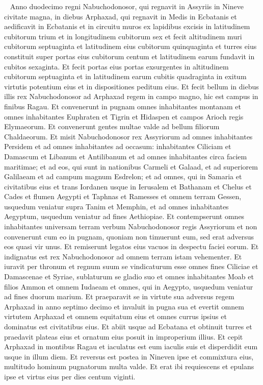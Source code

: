 
\begin{biblechapter}   
\verse Anno duodecimo regni Nabuchodonosor, qui regnavit in Assyriis in Nineve civitate magna, in diebus Arphaxad, qui regnavit in Medis in Ecbatanis 
\verse et aedificavit in Ecbatanis et in circuitu muros ex lapidibus excisis in latitudinem cubitorum trium et in longitudinem cubitorum sex et fecit altitudinem muri cubitorum septuaginta et latitudinem eius cubitorum quinquaginta 
\verse et turres eius constituit super portas eius cubitorum centum et latitudinem earum fundavit in cubitos sexaginta. 
\verse Et fecit portas eius portas exsurgentes in altitudinem cubitorum septuaginta et in latitudinem earum cubitis quadraginta in exitum virtutis potentium eius et in dispositiones peditum eius. 
\verse Et fecit bellum in diebus illis rex Nabuchodonosor ad Arphaxad regem in campo magno, hic est campus in finibus Ragau. 
\verse Et convenerunt in pugnam omnes inhabitantes montanam et omnes inhabitantes Euphraten et Tigrin et Hidaspen et campos Arioch regis Elymaeorum. Et convenerunt gentes multae valde ad bellum filiorum Chaldaeorum. 
\verse Et misit Nabuchodonosor rex Assyriorum ad omnes inhabitantes Persidem et ad omnes inhabitantes ad occasum: inhabitantes Ciliciam et Damascum et Libanum et Antilibanum et ad omnes inhabitantes circa faciem maritimae; 
\verse et ad eos, qui sunt in nationibus Carmeli et Galaad, et ad superiorem Galilaeam et ad campum magnum Esdrelon; 
\verse et ad omnes, qui in Samaria et civitatibus eius et trans Iordanen usque in Ierusalem et Bathanam et Chelus et Cades et flumen Aegypti et Taphnas et Ramesses et omnem terram Gessen,  
\verse usquedum veniatur supra Tanim et Memphin, et ad omnes inhabitantes Aegyptum, usquedum veniatur ad fines Aethiopiae. 
\verse Et contempserunt omnes inhabitantes universam terram verbum Nabuchodonosor regis Assyriorum et non convenerunt cum eo in pugnam, quoniam non timuerunt eum, sed erat adversus eos quasi vir unus. Et remiserunt legatos eius vacuos in despectu faciei eorum.  
\verse Et indignatus est rex Nabuchodonosor ad omnem terram istam vehementer. Et iuravit per thronum et regnum suum se vindicaturum esse omnes fines Ciliciae et Damascenae et Syriae, sublaturum se gladio suo et omnes inhabitantes Moab et filios Ammon et omnem Iudaeam et omnes, qui in Aegypto, usquedum veniatur ad fines duorum marium. 
\verse Et praeparavit se in virtute sua adversus regem Arphaxad in anno septimo decimo et invaluit in pugna sua et evertit omnem virtutem Arphaxad et omnem equitatum eius et omnes currus ipsius 
\verse et dominatus est civitatibus eius. Et abiit usque ad Ecbatana et obtinuit turres et praedavit plateas eius et ornatum eius posuit in improperium illius. 
\verse Et cepit Arphaxad in montibus Ragau et iaculatus est eum iaculis suis et disperdidit eum usque in illum diem. 
\verse Et reversus est postea in Nineven ipse et commixtura eius, multitudo hominum pugnatorum multa valde. Et erat ibi requiescens et epulans ipse et virtus eius per dies centum viginti. 
\end{biblechapter}

